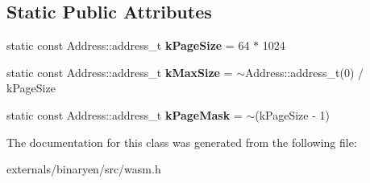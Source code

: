 \subsection*{Static Public Attributes}
\begin{DoxyCompactItemize}
\item 
\mbox{\label{classwasm_1_1_memory_a17830c94fae716f0013eb92806810422}} 
static const Address\+::address\+\_\+t {\bfseries k\+Page\+Size} = 64 $\ast$ 1024
\item 
\mbox{\label{classwasm_1_1_memory_a18e491d72576ded2fd331317bc4ffcb6}} 
static const Address\+::address\+\_\+t {\bfseries k\+Max\+Size} = $\sim$Address\+::address\+\_\+t(0) / k\+Page\+Size
\item 
\mbox{\label{classwasm_1_1_memory_a0aac4f3fd92c5260a778cf8741bc62df}} 
static const Address\+::address\+\_\+t {\bfseries k\+Page\+Mask} = $\sim$(k\+Page\+Size -\/ 1)
\end{DoxyCompactItemize}


The documentation for this class was generated from the following file\+:\begin{DoxyCompactItemize}
\item 
externals/binaryen/src/wasm.\+h\end{DoxyCompactItemize}
